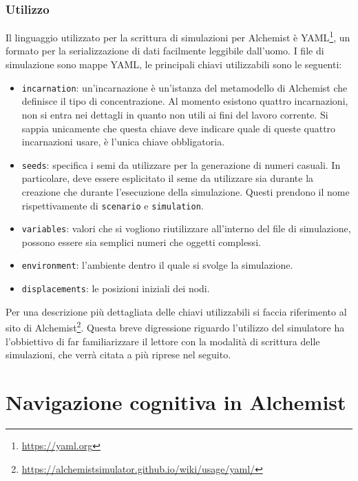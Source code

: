 \documentclass[12pt,a4paper,openright,oneside]{book}
\begin{document}
\subsection{Utilizzo}
Il linguaggio utilizzato per la scrittura di simulazioni per Alchemist è YAML\footnote{\url{https://yaml.org}}, un formato per la serializzazione di dati facilmente leggibile dall'uomo. I file di simulazione sono mappe YAML, le principali chiavi utilizzabili sono le seguenti:
\begin{itemize}
    \item \texttt{incarnation}: un'incarnazione è un'istanza del metamodello di Alchemist che definisce il tipo di concentrazione. Al momento esistono quattro incarnazioni, non si entra nei dettagli in quanto non utili ai fini del lavoro corrente. Si sappia unicamente che questa chiave deve indicare quale di queste quattro incarnazioni usare, è l'unica chiave obbligatoria.
    \item \texttt{seeds}: specifica i semi da utilizzare per la generazione di numeri casuali. In particolare, deve essere esplicitato il seme da utilizzare sia durante la creazione che durante l'esecuzione della simulazione. Questi prendono il nome rispettivamente di \texttt{scenario} e \texttt{simulation}.
    \item \texttt{variables}: valori che si vogliono riutilizzare all’interno del file di simulazione, possono essere sia semplici numeri che oggetti complessi.
    \item \texttt{environment}: l'ambiente dentro il quale si svolge la simulazione.
    \item \texttt{displacements}: le posizioni iniziali dei nodi.
\end{itemize}
Per una descrizione più dettagliata delle chiavi utilizzabili si faccia riferimento al sito di Alchemist\footnote{\url{https://alchemistsimulator.github.io/wiki/usage/yaml/}}. Questa breve digressione riguardo l'utilizzo del simulatore ha l'obbiettivo di far familiarizzare il lettore con la modalità di scrittura delle simulazioni, che verrà citata a più riprese nel seguito.

\chapter{Navigazione cognitiva in Alchemist}
\label{chap:development}
\end{document}
